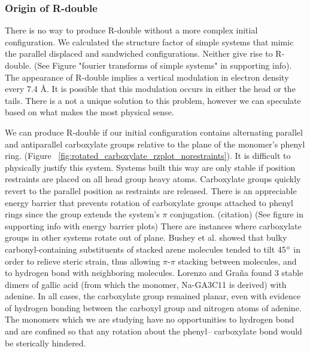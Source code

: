 \documentclass[journal=jpcbfk,manusciprt=article]{achemso}
\begin{document}
  \subsubsection{Origin of R-double}\label{section:rdouble}
  
  There is no way to produce R-double without a more complex initial configuration. We 
  calculated the structure factor of simple systems that mimic the parallel
  displaced and sandwiched configurations. Neither give rise to R-double. (See Figure "fourier
  transforms of simple systems" in supporting info). The appearance of R-double implies a
  vertical modulation in electron density every 7.4 \AA. It is possible that this modulation 
  occurs in either the head or the tails. There is a not a unique solution to this problem,
  however we can speculate based on what makes the most physical sense.
  
  We can produce R-double if our initial configuration contains alternating parallel and
  antiparallel carboxylate groups relative to the plane of the monomer's phenyl ring.
  (Figure ~\ref{fig:rotated_carboxylate_rzplot_norestraints}). It is difficult to physically
  justify this system. Systems built this way are only stable if position restraints are placed
  on all head group heavy atoms. Carboxylate groups quickly revert to the parallel position as 
  restraints are released. There is an appreciable energy barrier that prevents rotation
  of carboxylate groups attached to phenyl rings since the group extends the system's 
  $\pi$ conjugation. (citation) (See figure in supporting info with energy barrier plots)
  There are instances where carboxylate groups in other systems rotate out of plane. Bushey et
  al. showed that bulky carbonyl-containing substituents of stacked arene molecules tended to
  tilt 45$\degree$ in order to relieve steric strain, thus allowing $\pi$-$\pi$ stacking between 
  molecules, and to hydrogen bond with neighboring molecules. Lorenzo and Gra\~{n}a found 3
  stable dimers of gallic acid (from which the monomer, Na-GA3C11 is derived) with adenine. In
  all cases, the carboxylate group remained planar, even with evidence of hydrogen bonding
  between the carboxyl group and nitrogen atoms of adenine. The monomers which we are studying
  have no opportunities to hydrogen bond and are confined so that any rotation about the phenyl--
  carboxylate bond would be sterically hindered. 
  
\end{document}
